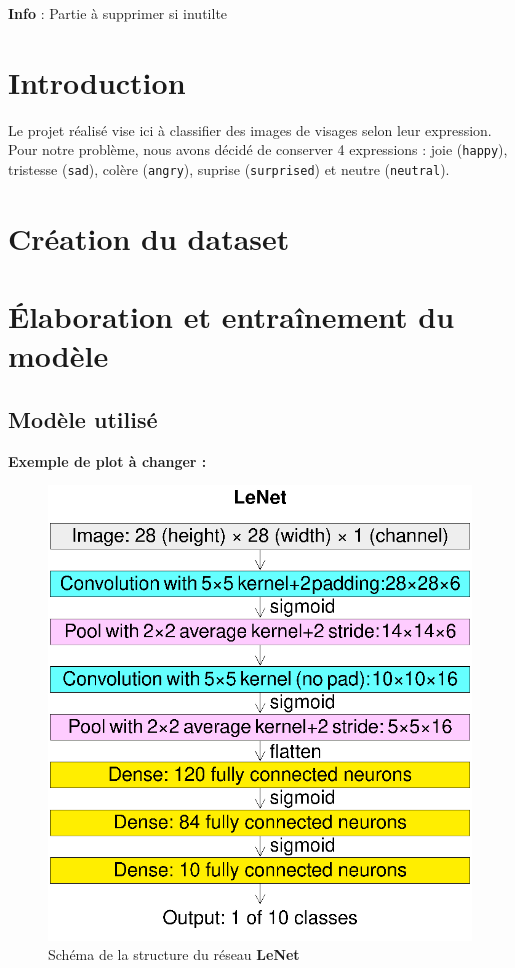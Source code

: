 \documentclass{report}
\begin{document}
\textbf{Info} : Partie à supprimer si inutilte

\newpage

\chapter*{Introduction}

Le projet réalisé vise ici à classifier des images de visages selon leur expression. Pour notre 
problème, nous avons décidé de conserver 4 expressions : joie (\texttt{happy}), tristesse (\texttt{sad}), 
colère (\texttt{angry}), suprise (\texttt{surprised}) et neutre (\texttt{neutral}).

\newpage



\chapter{Création du dataset}



\chapter{Élaboration et entraînement du modèle}

\section{Modèle utilisé}

\textbf{Exemple de plot à changer :} 

\begin{figure}[H]
    \centering
    \includegraphics[width=200 pt]{Sources/Reseaux/LeNet_network.png}
    \caption{Schéma de la structure du réseau \textbf{LeNet}}
    \label{fig:schema_LeNet}
\end{figure}
\end{document}
